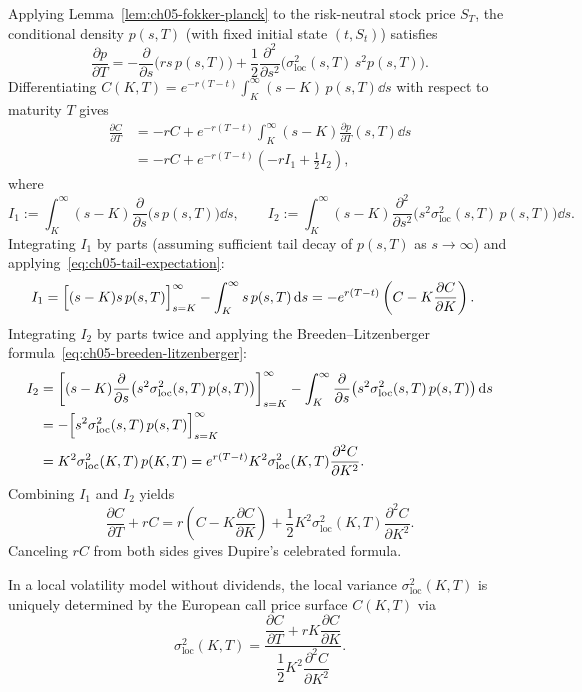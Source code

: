 Applying Lemma~\ref{lem:ch05-fokker-planck} to the risk-neutral stock price $S_T$, the conditional density $p(s, T)$ (with fixed initial state $(t, S_t)$) satisfies
\[
    \frac{\partial p}{\partial T} = -\frac{\partial}{\partial s}\bigl(r s\,p(s, T)\bigr) + \frac{1}{2}\frac{\partial^2}{\partial s^2}\bigl(\sigma_{\mathrm{loc}}^2(s, T)\,s^2 p(s, T)\bigr).
\]
Differentiating $C(K, T) = e^{-r(T-t)}\int_K^{\infty}(s - K)\,p(s, T)\dd s$ with respect to maturity $T$ gives
\begin{align*}
    \frac{\partial C}{\partial T}
    &= -r C + e^{-r(T-t)}\int_K^{\infty} (s - K)\frac{\partial p}{\partial T}(s, T)\dd s \\
    &= -r C + e^{-r(T-t)}\left(-r I_1 + \frac{1}{2} I_2\right),
\end{align*}
where
\[
    I_1 := \int_K^{\infty} (s - K)\frac{\partial}{\partial s}\bigl(s\,p(s, T)\bigr)\dd s, \qquad
    I_2 := \int_K^{\infty} (s - K)\frac{\partial^2}{\partial s^2}\bigl(s^2 \sigma_{\mathrm{loc}}^2(s, T)\,p(s, T)\bigr)\dd s.
\]
Integrating $I_1$ by parts (assuming sufficient tail decay of $p(s, T)$ as $s \to \infty$) and applying~\eqref{eq:ch05-tail-expectation}:
\begin{align*}
    I_1 &= \Bigl[(s - K) s\,p(s, T)\Bigr]_{s=K}^{\infty} - \int_K^{\infty} s\,p(s, T)\,\mathrm{d} s
    = -e^{r(T-t)}\left(C - K\frac{\partial C}{\partial K}\right).
\end{align*}
Integrating $I_2$ by parts twice and applying the Breeden--Litzenberger formula~\eqref{eq:ch05-breeden-litzenberger}:
\begin{align*}
    I_2 &= \left[(s - K)\frac{\partial}{\partial s}\bigl(s^2 \sigma_{\mathrm{loc}}^2(s, T)\,p(s, T)\bigr)\right]_{s=K}^{\infty}
    - \int_K^{\infty} \frac{\partial}{\partial s}\bigl(s^2 \sigma_{\mathrm{loc}}^2(s, T)\,p(s, T)\bigr)\,\mathrm{d} s \\
    &= -\Bigl[s^2 \sigma_{\mathrm{loc}}^2(s, T)\,p(s, T)\Bigr]_{s=K}^{\infty} \\
    &= K^2 \sigma_{\mathrm{loc}}^2(K, T)\,p(K, T)
    = e^{r(T-t)} K^2 \sigma_{\mathrm{loc}}^2(K, T)\frac{\partial^2 C}{\partial K^2}.
\end{align*}
Combining $I_1$ and $I_2$ yields
\[
    \frac{\partial C}{\partial T} + r C
    = r\left(C - K\frac{\partial C}{\partial K}\right) + \frac{1}{2} K^2 \sigma_{\mathrm{loc}}^2(K, T)\frac{\partial^2 C}{\partial K^2}.
\]
Canceling $rC$ from both sides gives Dupire's celebrated formula.

\begin{theorem}
    \label{thm:ch05-dupire}
    In a local volatility model without dividends, the local variance $\sigma_{\mathrm{loc}}^2(K, T)$ is uniquely determined by the European call price surface $C(K, T)$ via
    \begin{equation}
        \label{eq:ch05-dupire}
        \sigma_{\mathrm{loc}}^2(K, T) = \frac{\dfrac{\partial C}{\partial T} + r K \dfrac{\partial C}{\partial K}}{\dfrac{1}{2} K^2 \dfrac{\partial^2 C}{\partial K^2}}.
    \end{equation}
\end{theorem}

